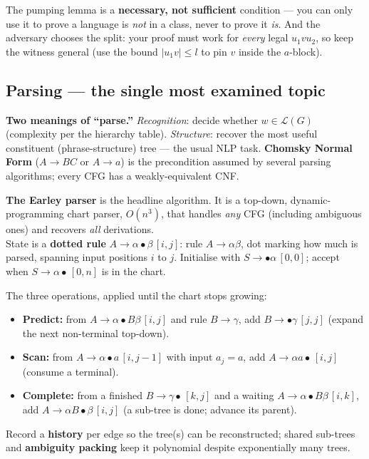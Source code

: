 \documentclass[11pt,a4paper]{article}
\begin{document}
\begin{gotcha}
The pumping lemma is a \textbf{necessary, not sufficient} condition --- you can only use it to prove a language is \emph{not} in a class, never to prove it \emph{is}. And the adversary chooses the split: your proof must work for \emph{every} legal $u_1vu_2$, so keep the witness general (use the bound $|u_1v|\le l$ to pin $v$ inside the $a$-block).
\end{gotcha}

\subsection{Parsing --- the single most examined topic}

\textbf{Two meanings of ``parse.''} \emph{Recognition}: decide whether $w\in\mathcal L(G)$ (complexity per the hierarchy table). \emph{Structure}: recover the most useful constituent (phrase-structure) tree --- the usual NLP task. \textbf{Chomsky Normal Form} ($A\to BC$ or $A\to a$) is the precondition assumed by several parsing algorithms; every CFG has a weakly-equivalent CNF.

\begin{must}
\textbf{The Earley parser} is the headline algorithm. It is a top-down, dynamic-programming chart parser, $O(n^3)$, that handles \emph{any} CFG (including ambiguous ones) and recovers \emph{all} derivations.\\[3pt]
State is a \textbf{dotted rule} $A\to\alpha\bullet\beta\,[i,j]$: rule $A\to\alpha\beta$, dot marking how much is parsed, spanning input positions $i$ to $j$. Initialise with $S\to\bullet\alpha\,[0,0]$; accept when $S\to\alpha\bullet\,[0,n]$ is in the chart.
\end{must}

The three operations, applied until the chart stops growing:
\begin{itemize}[leftmargin=*,itemsep=1pt]
  \item \textbf{Predict:} from $A\to\alpha\bullet B\beta\,[i,j]$ and rule $B\to\gamma$, add $B\to\bullet\gamma\,[j,j]$ (expand the next non-terminal top-down).
  \item \textbf{Scan:} from $A\to\alpha\bullet a\,[i,j-1]$ with input $a_j=a$, add $A\to\alpha a\bullet\,[i,j]$ (consume a terminal).
  \item \textbf{Complete:} from a finished $B\to\gamma\bullet\,[k,j]$ and a waiting $A\to\alpha\bullet B\beta\,[i,k]$, add $A\to\alpha B\bullet\beta\,[i,j]$ (a sub-tree is done; advance its parent).
\end{itemize}
Record a \textbf{history} per edge so the tree(s) can be reconstructed; shared sub-trees and \textbf{ambiguity packing} keep it polynomial despite exponentially many trees.
\end{document}
